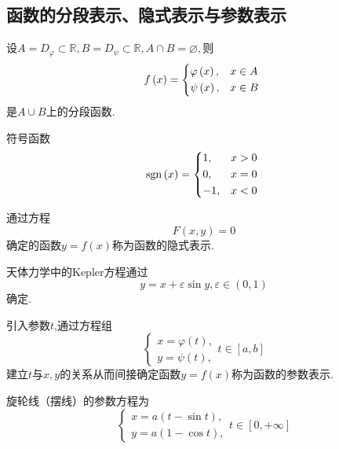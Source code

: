 \subsection{函数的分段表示、隐式表示与参数表示}
\begin{formal}
    \begin{definition}[函数的分段表示的定义]\label{def:函数的分段表示的定义}
        设$A=D_{\varphi}\subset\mathbb{R},B=D_{\psi}\subset\mathbb{R},A\cap B=\varnothing,$则\[
        f\left(x\right)=\begin{cases*}
            \varphi\left(x\right),&$x\in A$\\
            \psi\left(x\right),&$x\in B$
        \end{cases*}
        \]是$A\cup B$上的分段函数.
    \end{definition}
\end{formal}
\begin{brown}
    \begin{example}
        符号函数\[
        \text{sgn}\left(x\right)=\begin{cases*}
            1,&$x>0$\\
            0,&$x=0$\\
            -1,&$x<0$
        \end{cases*}
        \]
    \end{example}
\end{brown}
\begin{formal}
    \begin{definition}[函数的隐式表示的定义]\label{def:函数的隐式表示的定义}
        通过方程\[
        F\left(x,y\right)=0
        \]确定的函数$y=f\left(x\right)$称为函数的隐式表示.
    \end{definition}
\end{formal}
\begin{brown}
    \begin{example}
        天体力学中的\textup{Kepler}方程通过\[
        y=x+\varepsilon\sin y,\varepsilon\in\left(0,1\right)
        \]确定.
    \end{example}
\end{brown}
\begin{formal}
    \begin{definition}[函数的参数表示的定义]\label{def:函数的参数表示的定义}
        引入参数$t$,通过方程组\[
        \begin{cases*}
            x=\varphi\left(t\right),\\
            y=\psi\left(t\right),
        \end{cases*}t\in\left[a,b\right]
        \]建立$t$与$x,y$的关系从而间接确定函数$y=f\left(x\right)$称为函数的参数表示.
    \end{definition}
\end{formal}
\begin{brown}
    \begin{example}
        旋轮线（摆线）的参数方程为\[
        \begin{cases*}
            x=a\left(t-\sin t\right),\\
            y=a\left(1-\cos t\right),
        \end{cases*}t\in\left[0,+\infty\right]
        \]
    \end{example}
\end{brown}
